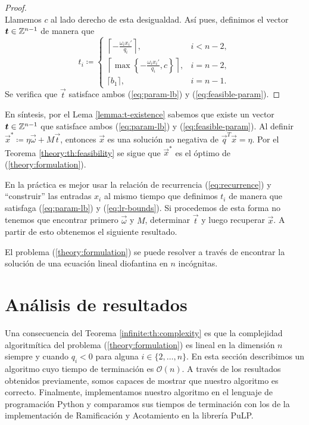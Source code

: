 \begin{proof}
\begin{equation*}
	\end{equation*}
	Llamemos $c$ al lado derecho de esta desigualdad. Así pues, definimos el vector
	$\boldsymbol{t} \in \mathbb{Z}^{n-1}$ de manera que
	\begin{equation*}
		t_i \coloneq \begin{cases}
			\left\lceil -\frac{\omega_ix_i'}{q_i} \right\rceil, & i < n - 2, \\[0.5em]
			\left\lceil \max\left\lbrace -\frac{\omega_ix_i'}{q_i}, c \right\rbrace
			\right\rceil, & i = n -2, \\[0.5em]
			\lceil b_1 \rceil, & i = n - 1.
		\end{cases}
	\end{equation*}
	Se verifica que $\vec{t}$ satisface ambos (\ref{eq:param-lb}) y (\ref{eq:feasible-param}).
\end{proof}

En síntesis, por el Lema \ref{lemma:t-existence} sabemos que existe un vector
$\boldsymbol{t} \in \mathbb{Z}^{n-1}$ que satisface ambos (\ref{eq:param-lb}) y (\ref{eq:feasible-param}).
Al definir $\vec{x}^* \coloneq \eta\vec{\omega} + M\vec{t}$, entonces $\vec{x}$ es una solución no
negativa de $\vec{q}^T\vec{x} = \eta$. Por el Teorema \ref{theory:th:feasibility} se sigue que
$\vec{x}^*$ es el óptimo de (\ref{theory:formulation}).

En la práctica es mejor usar la relación de recurrencia (\ref{eq:recurrence}) y ``construir'' las
entradas $x_i$ al mismo tiempo que definimos $t_i$ de manera que satisfaga
(\ref{eq:param-lb}) y (\ref{eq:lr-bounds}). Si procedemos de esta forma no tenemos que encontrar primero
$\vec{\omega}$ y $M$, determinar $\vec{t}$ y luego recuperar $\vec{x}$. A partir de esto obtenemos
el siguiente resultado.
\begin{theorem}
	\label{infinite:th:complexity}
	El problema (\ref{theory:formulation}) se puede resolver a través de encontrar la solución de
	una ecuación lineal diofantina en $n$ incógnitas.
\end{theorem}

\section{Análisis de resultados}
\noindent
Una consecuencia del Teorema \ref{infinite:th:complexity} es que la complejidad algoritmítica del
problema (\ref{theory:formulation}) es lineal en la dimensión $n$ siempre y cuando $q_i < 0$
para alguna $i \in \lbrace 2, \ldots, n\rbrace$. En esta sección describimos un algoritmo cuyo
tiempo de terminación es $\mathcal{O}(n)$. A través de los resultados obtenidos previamente, somos
capaces de mostrar que nuestro algoritmo es correcto. Finalmente, implementamos nuestro algoritmo en
el lenguaje de programación Python y comparamos sus tiempos de terminación con los de la
implementación de Ramificación y Acotamiento en la librería PuLP. 
